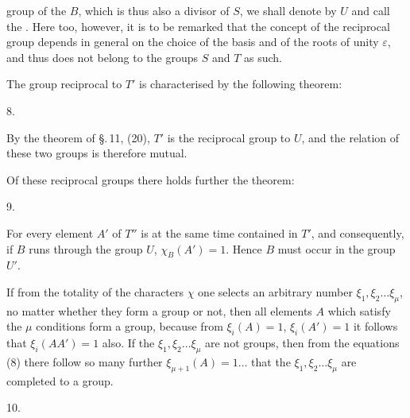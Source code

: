 group of the $B$, which is thus also a divisor of $S$, we shall
denote by $U$ and call the . Here too,
however, it is to be remarked that the concept of the reciprocal
group depends in general on the choice of the basis and of the
roots of unity $\varepsilon$, and thus does not belong to the
groups $S$ and $T$ as such.

The group reciprocal to $T'$ is characterised by the following
theorem:

8.\ 

By the theorem of \S.\,11, (20), $T'$ is the reciprocal group to
$U$, and the relation of these two groups is therefore mutual.

Of these reciprocal groups there holds further the theorem:

9.\ 

For every element $A'$ of $T''$ is at the same time contained in
$T'$, and consequently, if $B$ runs through the group $U$,
$\chi_B(A') = 1$. Hence $B$ must occur in the group $U'$.

If from the totality of the characters $\chi$ one selects an
arbitrary number $\xi_1, \xi_2 \dots \xi_\mu$, no matter whether
they form a group or not, then all elements $A$ which satisfy
the $\mu$ conditions
form a group, because from $\xi_i(A) = 1$, $\xi_i(A') = 1$ it
follows that $\xi_i(AA') = 1$ also. If the
$\xi_1, \xi_2 \dots \xi_\mu$ are not groups, then from the
equations (8) there follow so many further
$\xi_{\mu+1}(A) = 1 \dots$ that the
$\xi_1, \xi_2 \dots \xi_\mu$ are completed to a group.

10.\ 
